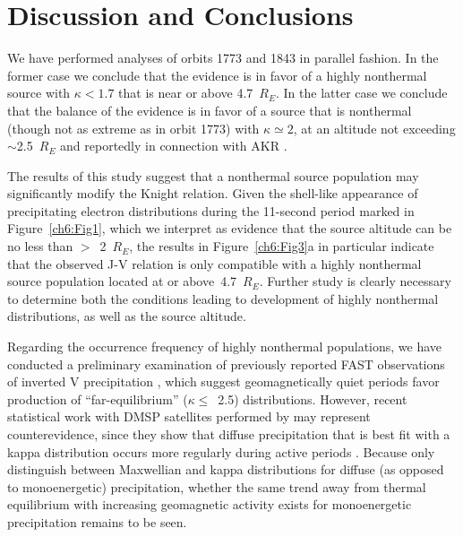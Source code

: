   \section{Discussion and Conclusions}

  We have performed analyses of orbits 1773 and 1843 in parallel fashion. In the
  former case we conclude that the evidence is in favor of a highly nonthermal
  source with $\kappa < 1.7$ that is near or above 4.7~$R_E$. In the latter case
  we conclude that the balance of the evidence is in favor of a source that is
  nonthermal (though not as extreme as in orbit 1773) with $\kappa \simeq 2$, at
  an altitude not exceeding $\sim$2.5~$R_E$ and reportedly in connection with
  AKR \citep{Ergun1998}.

  The results of this study suggest that a nonthermal source population may
  significantly modify the Knight relation. Given the shell-like appearance of
  precipitating electron distributions during the 11-second period marked in
  Figure~\ref{ch6:Fig1}, which we interpret as evidence that the source altitude
  can be no less than $>$~2~$R_E$, the results in Figure~\ref{ch6:Fig3}a in
  particular indicate that the observed J-V relation is only compatible with a
  highly nonthermal source population located at or above~4.7~$R_E$. Further
  study is clearly necessary to determine both the conditions leading to
  development of highly nonthermal distributions, as well as the source
  altitude.

  Regarding the occurrence frequency of highly nonthermal populations, we have
  conducted a preliminary examination of previously reported FAST observations
  of inverted V precipitation
  \citep{McFadden1998a,Carlson2001,Janhunen2001,Dombeck2013}, which suggest
  geomagnetically quiet periods favor production of ``far-equilibrium''
  ($\kappa \leq$~2.5) distributions. However, recent statistical work with DMSP
  satellites performed by \citet{McIntosh2014} may represent counterevidence,
  since they show that diffuse precipitation that is best fit with a kappa
  distribution occurs more regularly during active periods \citep[e.g., Figure~7
  in][]{McIntosh2014}. Because \citet{McIntosh2014} only distinguish between
  Maxwellian and kappa distributions for diffuse (as opposed to monoenergetic)
  precipitation, whether the same trend away from thermal equilibrium with
  increasing geomagnetic activity exists for monoenergetic precipitation remains
  to be seen.

